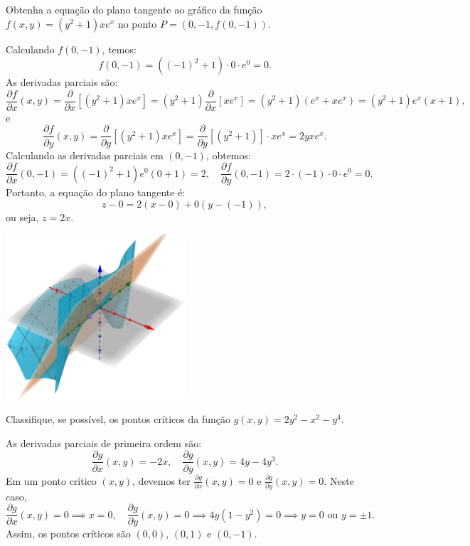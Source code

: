 \documentclass[12pt,a4paper]{article}
\begin{document}
\begin{ExerciseList}
\Exercise[title={2,5}] Obtenha a equação do plano tangente ao gráfico da função \(f(x, y) = (y^2 + 1)x e^x\) no ponto \(P = (0, -1, f(0, -1))\).

\Answer Calculando \(f(0, -1)\), temos:
\[
f(0, -1) = ((-1)^2 + 1) \cdot 0 \cdot e^0 = 0.
\]
As derivadas parciais são:
\[
\frac{\partial f}{\partial x}(x, y)
= \frac{\partial}{\partial x} \left[(y^2 + 1)x e^x \right]
= (y^2 + 1) \frac{\partial}{\partial x} \left[x e^x \right]
= (y^2 + 1)\left(e^x + x e^x\right)
= (y^2 + 1)e^x(x + 1),
\]
e
\[
\frac{\partial f}{\partial y}(x, y)
= \frac{\partial}{\partial y} \left[(y^2 + 1)x e^x \right]
= \frac{\partial}{\partial y} \left[(y^2 + 1)\right] \cdot x e^x
= 2y x e^x.
\]
Calculando as derivadas parciais em \((0, -1)\), obtemos:
\[
\frac{\partial f}{\partial x}(0, -1) = ((-1)^2 + 1)e^0(0 + 1) = 2, \quad
\frac{\partial f}{\partial y}(0, -1) = 2 \cdot (-1) \cdot 0 \cdot e^0 = 0.
\]
Portanto, a equação do plano tangente é:
\[
z - 0 = 2(x - 0) + 0(y - (-1)),
\]
ou seja, \(\boxed{z = 2x}\).

\begin{center}
\includegraphics[width=0.5\textwidth]{img/plano-tangente.png}
\end{center}


\Exercise[title={2,5}] Classifique, se possível, os pontos críticos da função \(g(x, y) = 2y^2 - x^2 - y^4\).

\Answer As derivadas parciais de primeira ordem são:
\[
\frac{\partial g}{\partial x}(x, y) = -2x, \quad \frac{\partial g}{\partial y}(x, y) = 4y - 4y^3.
\]
Em um ponto crítico $(x, y)$, devemos ter \(\frac{\partial g}{\partial x}(x, y) = 0\) e \(\frac{\partial g}{\partial y}(x, y) = 0\). Neste caso,
\[
\frac{\partial g}{\partial x}(x, y) = 0 \implies x = 0, \quad
\frac{\partial g}{\partial y}(x, y) = 0 \implies 4y(1 - y^2) = 0 \implies y = 0 \text{ ou } y = \pm 1.
\]
Assim, os pontos críticos são \((0, 0)\), \((0, 1)\) e \((0, -1)\).


\end{ExerciseList}
\end{document}
